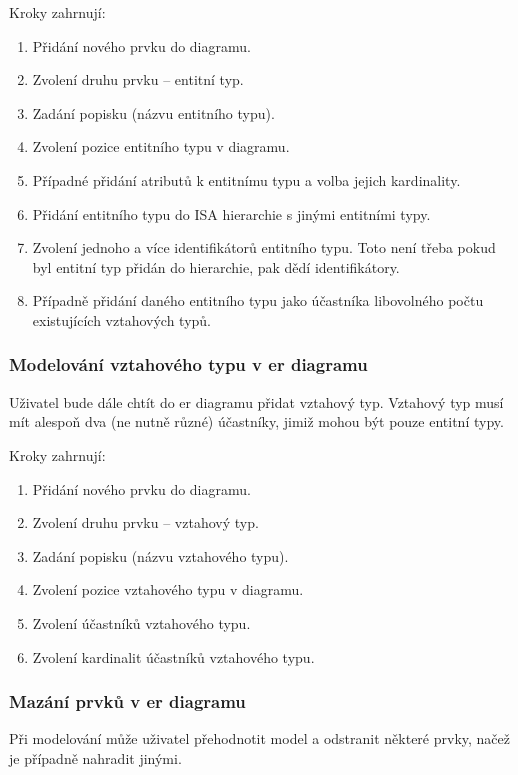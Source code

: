 Kroky zahrnují:
\begin{enumerate}
  \item Přidání nového prvku do diagramu.
  \item Zvolení druhu prvku -- entitní typ.
  \item Zadání popisku (názvu entitního typu).
  \item Zvolení pozice entitního typu v diagramu.
  \item Případné přidání atributů k entitnímu typu a volba jejich kardinality.
  \item Přidání entitního typu do ISA hierarchie s jinými entitními typy.
  \item Zvolení jednoho a více identifikátorů entitního typu.
        Toto není třeba pokud byl entitní typ přidán do hierarchie, pak dědí identifikátory.
  \item Případně přidání daného entitního typu jako účastníka libovolného počtu existujících vztahových typů.
\end{enumerate}

\subsubsection*{Modelování vztahového typu v \acrshort{er} diagramu}
Uživatel bude dále chtít do \acrshort{er} diagramu přidat vztahový typ.
Vztahový typ musí mít alespoň dva (ne nutně různé) účastníky, jimiž mohou být pouze entitní typy.

Kroky zahrnují:
\begin{enumerate}
  \item Přidání nového prvku do diagramu.
  \item Zvolení druhu prvku -- vztahový typ.
  \item Zadání popisku (názvu vztahového typu).
  \item Zvolení pozice vztahového typu v diagramu.
  \item Zvolení účastníků vztahového typu.
  \item Zvolení kardinalit účastníků vztahového typu.
\end{enumerate}

\subsubsection*{Mazání prvků v \acrshort{er} diagramu}

Při modelování může uživatel přehodnotit model a odstranit některé prvky, načež je případně nahradit jinými.

